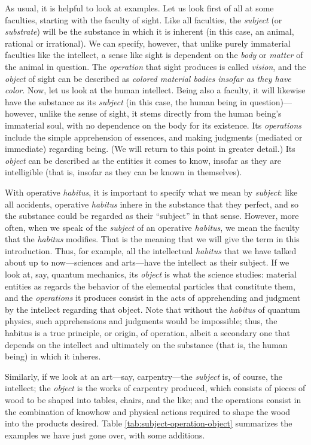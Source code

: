 \documentclass[
  12pt,
]{memoir}
\begin{document}
As usual, it is helpful to look at examples. Let us look first of all at
some faculties, starting with the faculty of sight. Like all faculties,
the \emph{subject} (or \emph{substrate}) will be the substance in which
it is inherent (in this case, an animal, rational or irrational). We can
specify, however, that unlike purely immaterial faculties like the
intellect, a sense like sight is dependent on the \emph{body} or
\emph{matter} of the animal in question. The \emph{operation} that sight
produces is called \emph{vision}, and the \emph{object} of sight can be
described as \emph{colored material bodies insofar as they have color}.
Now, let us look at the human intellect. Being also a faculty, it will
likewise have the substance as its \emph{subject} (in this case, the
human being in question)---however, unlike the sense of sight, it stems
directly from the human being's immaterial soul, with no dependence on
the body for its existence. Its \emph{operations} include the simple
apprehension of essences, and making judgments (mediated or immediate)
regarding being. (We will return to this point in greater detail.) Its
\emph{object} can be described as the entities it comes to know, insofar
as they are intelligible (that is, insofar as they can be known in
themselves).

With operative \emph{habitus}, it is important to specify what we mean
by \emph{subject}: like all accidents, operative \emph{habitus} inhere
in the substance that they perfect, and so the substance could be
regarded as their ``subject'' in that sense. However, more often, when
we speak of the \emph{subject} of an operative \emph{habitus}, we mean
the faculty that the \emph{habitus} modifies. That is the meaning that
we will give the term in this introduction. Thus, for example, all the
intellectual \emph{habitus} that we have talked about up to
now---sciences and arts---have the intellect as their subject. If we
look at, say, quantum mechanics, its \emph{object} is what the science
studies: material entities as regards the behavior of the elemental
particles that constitute them, and the \emph{operations} it produces
consist in the acts of apprehending and judgment by the intellect
regarding that object. Note that without the \emph{habitus} of quantum
physics, such apprehensions and judgments would be impossible; thus, the
habitus is a true principle, or origin, of operation, albeit a secondary
one that depends on the intellect and ultimately on the substance (that
is, the human being) in which it inheres.

Similarly, if we look at an art---say, carpentry---the \emph{subject}
is, of course, the intellect; the \emph{object} is the works of
carpentry produced, which consists of pieces of wood to be shaped into
tables, chairs, and the like; and the operations consist in the
combination of knowhow and physical actions required to shape the wood
into the products desired. Table \ref{tab:subject-operation-object}
summarizes the examples we have just gone over, with some additions.
\end{document}
